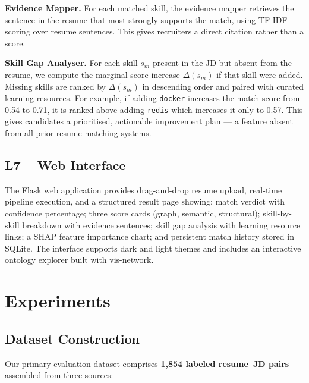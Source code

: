 \documentclass[conference]{IEEEtran}
\begin{document}
\textbf{Evidence Mapper.} For each matched skill, the evidence mapper
retrieves the sentence in the resume that most strongly supports the match,
using TF-IDF scoring over resume sentences. This gives recruiters a direct
citation rather than a score.

\textbf{Skill Gap Analyser.} For each skill $s_m$ present in the JD but
absent from the resume, we compute the marginal score increase $\Delta(s_m)$
if that skill were added. Missing skills are ranked by $\Delta(s_m)$ in
descending order and paired with curated learning resources. For example, if
adding \texttt{docker} increases the match score from 0.54 to 0.71, it is
ranked above adding \texttt{redis} which increases it only to 0.57. This
gives candidates a prioritised, actionable improvement plan --- a feature
absent from all prior resume matching systems.

\subsection{L7 -- Web Interface}
The Flask web application provides drag-and-drop resume upload, real-time
pipeline execution, and a structured result page showing: match verdict with
confidence percentage; three score cards (graph, semantic, structural);
skill-by-skill breakdown with evidence sentences; skill gap analysis with
learning resource links; a SHAP feature importance chart; and persistent
match history stored in SQLite. The interface supports dark and light themes
and includes an interactive ontology explorer built with vis-network.

\section{Experiments}

\subsection{Dataset Construction}
Our primary evaluation dataset comprises \textbf{1,854 labeled resume--JD
pairs} assembled from three sources:
\end{document}
